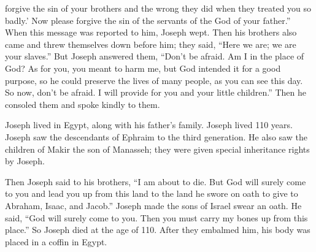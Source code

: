 {forgive
the sin
of your brothers
and the wrong
they did when they treated
you so badly.’ Now
please
forgive
the sin of the servants
of the God
of your father.”
When this message was reported
to him,
Joseph
wept.
Then
his brothers
also
came and threw
themselves down before
him; they said,
“Here
we are; we are your slaves.”
But Joseph
answered
them,
“Don’t
be afraid.
Am
I in the place
of God?
As for you,
you meant
to harm
me, but God
intended
it for a good
purpose, so
he
could preserve
the lives of many
people,
as you can see this
day.
So now,
don’t
be afraid.
I
will provide
for you and your little children.”
Then he consoled
them and spoke
kindly to them.
\par }{\PP {}Joseph
lived
in Egypt,
along with his father’s
family.
Joseph
lived
110
years.
Joseph
saw
the descendants
of Ephraim
to the third generation.
He also
saw the children of
Makir
the son
of Manasseh;
they were
given special
inheritance rights by Joseph.
\par }{\PP {}Then Joseph
said to
his brothers,
“I am
about to die.
But God
will surely
come to you and lead
you up
from
this
land
to
the land
he swore
on oath to give to Abraham,
Isaac,
and Jacob.”
Joseph
made the sons
of Israel
swear
an oath.
He said,
“God
will surely
come
to you. Then
you must
carry my bones
up
from this place.”
So Joseph
died
at the age of 110.
After they embalmed
him, his body was placed
in a coffin
in Egypt.
\par }
